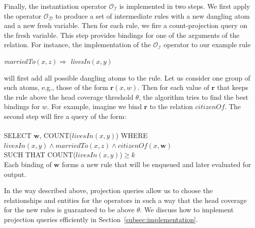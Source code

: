 Finally, the instantiation operator $\mathcal{O_I}$ is implemented in two steps. 
We first apply the operator $\mathcal{O_D}$ to produce a set of intermediate rules 
with a new dangling atom and a new fresh variable.
Then for each rule, we fire a count-projection query on the fresh variable. 
This step provides bindings for one of the arguments of the relation.
For instance, the implementation of the $\mathcal{O_I}$ operator to our example 
rule 
\begin{center}
\emph{marriedTo}$(x,z) \Rightarrow $ \emph{livesIn}$(x,y)$
\end{center}

\noindent will first add all possible dangling atoms to the rule. Let us consider one group of such atoms, e.g., those of the form
$\bm{r}(x,w)$. Then for each
value of $\bm{r}$ that keeps the rule above the head coverage threshold $\theta$, the algorithm tries to find the best bindings for 
$w$. For example, imagine we bind $\bm{r}$ to the relation $citizenOf$. The second step will fire a query of the form:
\\\\
\noindent
SELECT $\bm{w}$, COUNT($livesIn(x,y)$) WHERE \\ 
$livesIn(x,y) \wedge marriedTo(x,z) \wedge citizenOf(x,\bm{w})$ \\
SUCH THAT COUNT($livesIn(x,y)$)$\ge k$\\

\noindent Each binding of $\bm{w}$ forms a new rule that will be enqueued and later evaluated for output.

In the way described above, projection queries allow us to choose the relationships and entities for the operators 
in such a way that the head coverage for the new rules is guaranteed to be above $\theta$.
We discuss how to implement projection queries efficiently in Section~\ref{subsec:implementation}.




